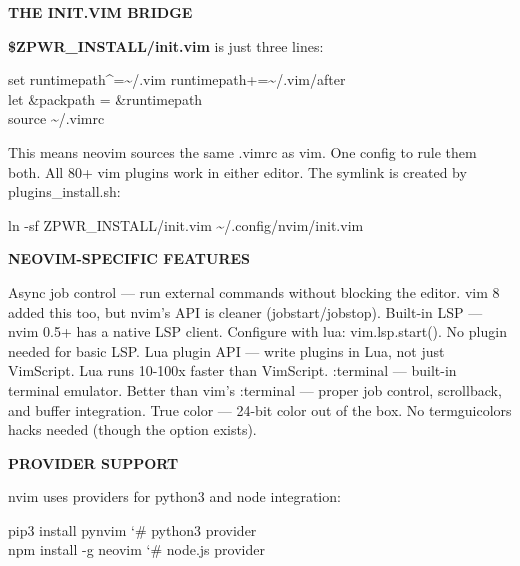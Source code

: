 \documentclass[11pt,a4paper,twoside]{book}
\begin{document}
\vspace{12pt}
{\bfseries\color{neonyellow} THE INIT.VIM BRIDGE}\vspace{4pt}

\textbf{\$ZPWR\_INSTALL/init.vim} is just three lines:

\begin{codebox}
\color{neongreen}set runtimepath\textasciicircum{}=\textasciitilde{}/.vim runtimepath+=\textasciitilde{}/.vim/after\\
\color{neongreen}let \&packpath = \&runtimepath\\
\color{neongreen}source \textasciitilde{}/.vimrc\\
\end{codebox}

This means neovim sources the same .vimrc as vim. One config to rule them both. All 80+ vim plugins work in either editor. The symlink is created by plugins\_install.sh:

\begin{codebox}
\color{neongreen}ln -sf ZPWR\_INSTALL/init.vim \textasciitilde{}/.config/nvim/init.vim\\
\end{codebox}


\vspace{12pt}
{\bfseries\color{neonyellow} NEOVIM-SPECIFIC FEATURES}\vspace{4pt}

Async job control  — run external commands without blocking the editor. vim 8 added this too, but nvim's API is cleaner (jobstart/jobstop). Built-in LSP       — nvim 0.5+ has a native LSP client. Configure with lua: vim.lsp.start(). No plugin needed for basic LSP. Lua plugin API     — write plugins in Lua, not just VimScript. Lua runs 10-100x faster than VimScript. :terminal          — built-in terminal emulator. Better than vim's :terminal — proper job control, scrollback, and buffer integration. True color         — 24-bit color out of the box. No termguicolors hacks needed (though the option exists).


\vspace{12pt}
{\bfseries\color{neonyellow} PROVIDER SUPPORT}\vspace{4pt}

nvim uses providers for python3 and node integration:

\begin{codebox}
\color{neongreen}pip3 install pynvim          {\char`\#} python3 provider\\
\color{neongreen}npm install -g neovim        {\char`\#} node.js provider\\
\end{codebox}
\end{document}
